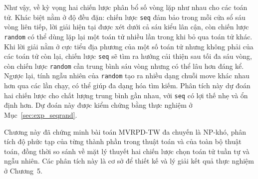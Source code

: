 \documentclass[../DoAn.tex]{subfiles}
\begin{document}
Như vậy, về kỳ vọng hai chiến lược phân bổ số vòng lặp như nhau cho các toán tử. Khác biệt nằm ở độ đều đặn: chiến lược \texttt{seq} đảm bảo trong mỗi cửa sổ sáu vòng liên tiếp, lời giải hiện tại được xét dưới cả sáu kiểu lân cận, còn chiến lược \texttt{random} có thể dùng lặp lại một toán tử nhiều lần trong khi bỏ qua toán tử khác. Khi lời giải nằm ở cực tiểu địa phương của một số toán tử nhưng không phải của các toán tử còn lại, chiến lược \texttt{seq} sẽ tìm ra hướng cải thiện sau tối đa sáu vòng, còn chiến lược \texttt{random} cần trung bình sáu vòng nhưng có thể lâu hơn đáng kể. Ngược lại, tính ngẫu nhiên của \texttt{random} tạo ra nhiều dạng chuỗi move khác nhau hơn qua các lần chạy, có thể giúp đa dạng hóa tìm kiếm. Phân tích này dự đoán hai chiến lược cho chất lượng trung bình gần nhau, với \texttt{seq} có lợi thế nhẹ và ổn định hơn. Dự đoán này được kiểm chứng bằng thực nghiệm ở Mục~\ref{sec:exp_seqrand}.

\bigskip
Chương này đã chứng minh bài toán MVRPD-TW đa chuyến là NP-khó, phân tích độ phức tạp của từng thành phần trong thuật toán và của toàn bộ thuật toán, đồng thời so sánh về mặt lý thuyết hai chiến lược chọn toán tử tuần tự và ngẫu nhiên. Các phân tích này là cơ sở để thiết kế và lý giải kết quả thực nghiệm ở Chương~5.
\end{document}
